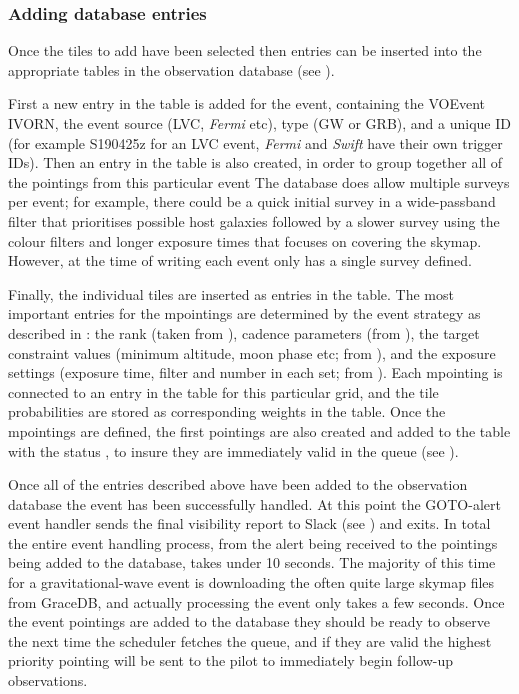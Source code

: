 \begin{colsection}
\begin{colsection}
\subsubsection{Adding database entries}

Once the tiles to add have been selected then entries can be inserted into the appropriate tables in the observation database (see ).

First a new entry in the  table is added for the event, containing the VOEvent IVORN, the event source (LVC, \textit{Fermi} etc), type (GW or GRB), and a unique ID (for example S190425z for an LVC event, \textit{Fermi} and \textit{Swift} have their own trigger IDs). Then an entry in the  table is also created, in order to group together all of the pointings from this particular event The database does allow multiple surveys per event; for example, there could be a quick initial survey in a wide-passband filter that prioritises possible host galaxies followed by a slower survey using the colour filters and longer exposure times that focuses on covering the skymap. However, at the time of writing each event only has a single survey defined.

Finally, the individual tiles are inserted as entries in the  table. The most important entries for the mpointings are determined by the event strategy as described in : the rank (taken from ), cadence parameters (from ), the target constraint values (minimum altitude, moon phase etc; from ), and the exposure settings (exposure time, filter and number in each set; from ). Each mpointing is connected to an entry in the  table for this particular grid, and the tile probabilities are stored as corresponding weights in the  table. Once the mpointings are defined, the first pointings are also created and added to the  table with the status , to insure they are immediately valid in the queue (see ).

Once all of the entries described above have been added to the observation database the event has been successfully handled. At this point the GOTO-alert event handler sends the final visibility report to Slack (see ) and exits. In total the entire event handling process, from the alert being received to the pointings being added to the database, takes under 10 seconds. The majority of this time for a gravitational-wave event is downloading the often quite large skymap files from GraceDB, and actually processing the event only takes a few seconds. Once the event pointings are added to the database they should be ready to observe the next time the scheduler fetches the queue, and if they are valid the highest priority pointing will be sent to the pilot to immediately begin follow-up observations.


\end{colsection}
\end{colsection}

